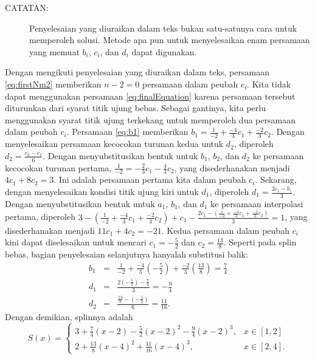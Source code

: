 \begin{description}
\begin{description}
\item [{CATATAN:}] Penyelesaian yang diuraikan dalam teks bukan satu-satunya
cara untuk memperoleh solusi. Metode apa pun untuk menyelesaikan enam
persamaan yang memuat $b_{i}$, $c_{i}$, dan $d_{i}$ dapat digunakan.
\end{description}
\item [{\ref{exc:cubicSplines-11}:}] Dengan mengikuti penyelesaian yang
diuraikan dalam teks, persamaan \ref{eq:firstNm2} memberikan $n-2=0$
persamaan dalam peubah $c_{i}$. Kita tidak dapat menggunakan persamaan
\ref{eq:finalEquation} karena persamaan tersebut diturunkan dari
syarat titik ujung bebas. Sebagai gantinya, kita perlu menggunakan
syarat titik ujung terkekang untuk memperoleh dua persamaan dalam
peubah $c_{i}$. Persamaan \ref{eq:b1} memberikan $b_{1}=\frac{1}{-2}+\frac{-4}{3}c_{1}+\frac{-2}{3}c_{2}$.
Dengan menyelesaikan persamaan kecocokan turunan kedua untuk $d_{2}$,
diperoleh $d_{2}=\frac{c_{2}-c_{1}}{6}$. Dengan menyubstitusikan
bentuk untuk $b_{1}$, $b_{2}$, dan $d_{2}$ ke persamaan kecocokan
turunan pertama, $\frac{1}{-2}=-\frac{2}{3}c_{1}-\frac{4}{3}c_{2}$,
yang disederhanakan menjadi $4c_{1}+8c_{2}=3$. Ini adalah persamaan
pertama kita dalam peubah $c_{i}$. Sekarang, dengan menyelesaikan
kondisi titik ujung kiri untuk $d_{1}$, diperoleh $d_{1}=\frac{2c_{1}-b_{1}}{3}$.
Dengan menyubstitusikan bentuk untuk $a_{1}$, $b_{1}$, dan $d_{1}$
ke persamaan interpolasi pertama, diperoleh $3-(\frac{1}{-2}+\frac{-4}{3}c_{1}+\frac{-2}{3}c_{2})+c_{1}-\frac{2c_{1}-(\frac{1}{-2}+\frac{-4}{3}c_{1}+\frac{-2}{3}c_{2})}{3}=1$,
yang disederhanakan menjadi $11c_{1}+4c_{2}=-21$. Kedua persamaan
dalam peubah $c_{i}$ kini dapat diselesaikan untuk mencari $c_{1}=-\frac{5}{2}$
dan $c_{2}=\frac{13}{8}$. Seperti pada splin bebas, bagian penyelesaian
selanjutnya hanyalah substitusi balik: 
\begin{eqnarray*}
b_{1} & = & \frac{1}{-2}+\frac{-4}{3}\left(-\frac{5}{2}\right)+\frac{-2}{3}\left(\frac{13}{8}\right)=\frac{7}{4}\\
d_{1} & = & \frac{2(-\frac{5}{2})-\frac{7}{4}}{3}=-\frac{9}{4}\\
d_{2} & = & \frac{\frac{13}{8}-\left(-\frac{5}{2}\right)}{6}=\frac{11}{16}.
\end{eqnarray*}
Dengan demikian, splinnya adalah
\[
S(x)=\begin{cases}
3+\frac{7}{4}(x-2)-\frac{5}{2}(x-2)^{2}-\frac{9}{4}(x-2)^{3}, & x\in[1,2]\\
2+\frac{13}{8}(x-4)^{2}+\frac{11}{16}(x-4)^{3}, & x\in[2,4].
\end{cases}
\]


\end{description}
